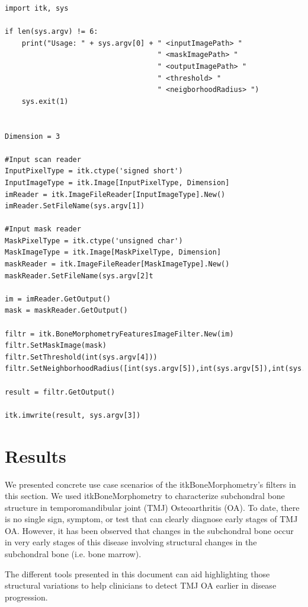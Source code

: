 \documentclass{InsightArticle}
\begin{document}
\begin{verbatim}
import itk, sys

if len(sys.argv) != 6:
    print("Usage: " + sys.argv[0] + " <inputImagePath> "
                                    " <maskImagePath> "
                                    " <outputImagePath> "
                                    " <threshold> "
                                    " <neigborhoodRadius> ")
    sys.exit(1)


Dimension = 3

#Input scan reader
InputPixelType = itk.ctype('signed short')
InputImageType = itk.Image[InputPixelType, Dimension]
imReader = itk.ImageFileReader[InputImageType].New()
imReader.SetFileName(sys.argv[1])

#Input mask reader
MaskPixelType = itk.ctype('unsigned char')
MaskImageType = itk.Image[MaskPixelType, Dimension]
maskReader = itk.ImageFileReader[MaskImageType].New()
maskReader.SetFileName(sys.argv[2]t

im = imReader.GetOutput()
mask = maskReader.GetOutput()

filtr = itk.BoneMorphometryFeaturesImageFilter.New(im)
filtr.SetMaskImage(mask)
filtr.SetThreshold(int(sys.argv[4]))
filtr.SetNeighborhoodRadius([int(sys.argv[5]),int(sys.argv[5]),int(sys.argv[5])])

result = filtr.GetOutput()

itk.imwrite(result, sys.argv[3])
\end{verbatim}

\normalsize
\newpage
\section{Results}
\label{sec:results}

We presented concrete use case scenarios of the itkBoneMorphometry's filters in this section. We used itkBoneMorphometry to characterize subchondral bone structure in temporomandibular joint (TMJ) Osteoarthritis (OA). To date, there is no single sign, symptom, or test that can clearly diagnose early stages of TMJ OA. However, it has been observed that changes in the subchondral bone occur in very early stages of this disease involving structural changes in the subchondral bone (i.e. bone marrow).

The different tools presented in this document can aid highlighting those structural variations to help clinicians to detect TMJ OA earlier in disease progression.
\end{document}
